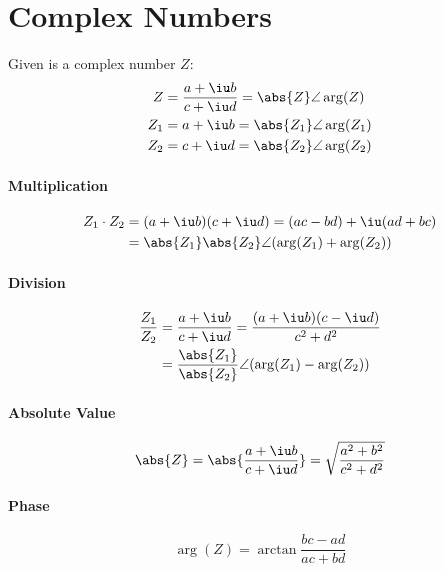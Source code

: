 
\section{Complex Numbers} %
	Given is a complex number $Z$:
	\begin{align*}
		Z &= \frac{a + \iu b}{c + \iu d} = \abs{Z} \angle \arg(Z) \\
		Z_1 &= a + \iu b = \abs{Z_1} \angle \arg(Z_1) \\
		Z_2 &= c + \iu d = \abs{Z_2} \angle \arg(Z_2)
	\end{align*}
	
	\paragraph{Multiplication} %
		\begin{align*}
			Z_1\cdot Z_2 &= (a + \iu b)(c + \iu d) = (ac - bd) + \iu (ad + bc) \\
			&= \abs{Z_1} \abs{Z_2} \angle (\arg(Z_1) + \arg(Z_2))
		\end{align*}
	
	\paragraph{Division} %
		\begin{align*}
			\frac{Z_1}{Z_2} &= \frac{a + \iu b}{c + \iu d} = \frac{(a + \iu b)(c - \iu d)}{c^2 + d^2} \\
			&= \frac{\abs{Z_1}}{\abs{Z_2}} \angle (\arg(Z_1) - \arg(Z_2))
		\end{align*}
	
	\paragraph{Absolute Value} %
		\[
			\abs{Z} = \abs{\frac{a + \iu b}{c + \iu d}} = \sqrt{\frac{a^2 + b^2}{c^2 + d^2}}
		\]
	
	\paragraph{Phase} %
		\[
			\arg(Z) = \arctan \frac{bc-ad}{ac+bd}
		\]
